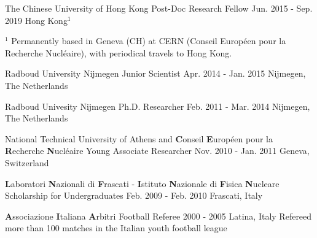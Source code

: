 
\begin{cventries}
\cventry
{The Chinese University of Hong Kong} %
{Post-Doc Research Fellow} %
{Jun. 2015 - Sep. 2019} %
{Hong Kong$^{1}$}
{\CurStatDet}
\vspace{-0.5em}
        
{\tiny $^{1}$ Permanently based in Geneva (CH) at CERN (Conseil Europ\'een pour
la Recherche Nucl\'eaire), with periodical travels to Hong Kong.}

\cventry
{Radboud University Nijmegen} %
{Junior Scientist} %
{Apr. 2014 - Jan. 2015} %
{Nijmegen, The Netherlands} %
{\JuniorScientist}

\cventry
{Radboud Univesity Nijmegen} %
{Ph.D. Researcher} %
{Feb. 2011  - Mar. 2014} %
{Nijmegen, The Netherlands} %
{\Phd}

\cventry
{National Technical University of Athens and \textbf{C}onseil
\textbf{E}urop\'een pour la \textbf{R}echerche
\textbf{N}ucl\'eaire} %
{Young Associate Researcher} %
{Nov. 2010 - Jan. 2011} %
{Geneva, Switzerland} %
{\CERN}

\cventry
{\textbf{L}aboratori \textbf{N}azionali di \textbf{F}rascati -
\textbf{I}stituto \textbf{N}azionale di \textbf{F}isica \textbf{N}ucleare} %
{Scholarship for Undergraduates} %
{Feb. 2009 - Feb. 2010} %
{Frascati, Italy} %
{\Master}

\cventry
{\textbf{A}ssociazione \textbf{I}taliana \textbf{A}rbitri} %
{Football Referee} %
{2000 - 2005} %
{Latina, Italy} %
{Refereed more than 100 matches in the Italian youth football league}

\end{cventries}
